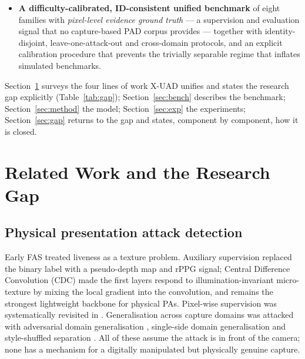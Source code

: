 \documentclass[conference]{IEEEtran}
\begin{document}
\begin{itemize}
      hosted-MLLM back-end is constrained by the same record and its output is
      re-verified against it. The end product is the operator verdict
      \texttt{Attack / Confidence / Risk} plus a traceable rationale.
\item \textbf{A difficulty-calibrated, ID-consistent unified benchmark} of eight
      families with \emph{pixel-level evidence ground truth} --- a supervision and
      evaluation signal that no capture-based PAD corpus provides --- together with
      identity-disjoint, leave-one-attack-out and cross-domain protocols, and an
      explicit calibration procedure that prevents the trivially separable regime
      that inflates simulated benchmarks.
\end{itemize}

Section~\ref{sec:related} surveys the four lines of work X-UAD unifies and states
the research gap explicitly (Table~\ref{tab:gap}); Section~\ref{sec:bench}
describes the benchmark; Section~\ref{sec:method} the model;
Section~\ref{sec:exp} the experiments; Section~\ref{sec:gap} returns to the gap and
states, component by component, how it is closed.

\section{Related Work and the Research Gap}\label{sec:related}

\subsection{Physical presentation attack detection}
Early FAS treated liveness as a texture problem. Auxiliary supervision
\cite{liu2018auxiliary} replaced the binary label with a pseudo-depth map and rPPG
signal; Central Difference Convolution (CDC) \cite{yu2020cdcn} made the first
layers respond to illumination-invariant micro-texture by mixing the local gradient
into the convolution, and remains the strongest lightweight backbone for physical
PAs. Pixel-wise supervision was systematically revisited in \cite{yu2021revisiting}.
Generalisation across capture domains was attacked with adversarial domain
generalisation \cite{shao2019mada}, single-side domain generalisation
\cite{jia2020ssdg} and style-shuffled separation \cite{wang2022ssan}. All of these
assume the attack is in front of the camera; none has a mechanism for a digitally
manipulated but physically genuine capture.
\end{document}
